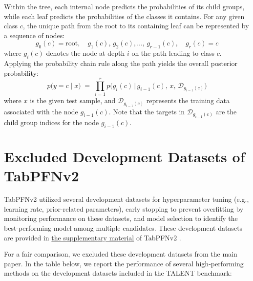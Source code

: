 \documentclass{article}
\theoremstyle{plain}
\theoremstyle{definition}
\theoremstyle{remark}
\begin{document}
Within the tree, each internal node predicts the probabilities of its child groups, while each leaf predicts the probabilities of the classes it contains. For any given class $c$, the unique path from the root to its containing leaf can be represented by a sequence of nodes:
\[
g_0(c)=\text{root},\quad
g_1(c),\,g_2(c),\dots,\,g_{r-1}(c),\quad
g_r(c)=c
\]
where $g_i(c)$ denotes the node at depth \(i\) on the path leading to class $c$. Applying the probability chain rule along the path yields the overall posterior probability:
\begin{equation}
p\!\bigl(y=c \mid x\bigr)
      \;=\;
      \prod_{i=1}^{r}
         p\!\bigl(g_i(c)\,\bigl|\,g_{i-1}(c),\,x,\,\mathcal D_{g_{i-1}(c)}\bigr)
\label{eq:hix-chain}
\end{equation}
where $x$ is the given test sample, and $\mathcal D_{g_{i-1}(c)}$ represents the training data associated with the node $g_{i-1}(c)$. Note that the targets in $\mathcal D_{g_{i-1}(c)}$ are the child group indices for the node $g_{i-1}(c)$.

\section{Excluded Development Datasets of TabPFNv2} \label{sec:appendix:excluded_datasets}

TabPFNv2 utilized several development datasets for hyperparameter tuning (e.g., learning rate, prior-related parameters), early stopping to prevent overfitting by monitoring performance on these datasets, and model selection to identify the best-performing model among multiple candidates. These development datasets are provided in \href{https://static-content.springer.com/esm/art%3A10.1038%2Fs41586-024-08328-6/MediaObjects/41586_2024_8328_MOESM2_ESM.pdf}{the supplementary material} of TabPFNv2 \cite{hollmannAccuratePredictionsSmall2025}.

For a fair comparison, we excluded these development datasets from the main paper. In the table below, we report the performance of several high-performing methods on the development datasets included in the TALENT benchmark:
\end{document}
